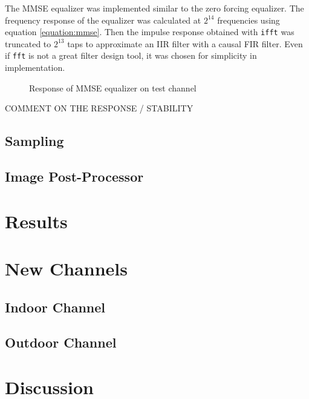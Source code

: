 The MMSE equalizer was implemented similar to the zero forcing equalizer. The frequency response of the equalizer was calculated at $2^{14}$ frequencies using equation \ref{equation:mmse}. Then the impulse response obtained with \texttt{ifft} was truncated to $2^{13}$ taps to approximate an IIR filter with a causal FIR filter. Even if \texttt{fft} is not a great filter design tool, it was chosen for simplicity in implementation.

\begin{figure}
\caption{Response of MMSE equalizer on test channel}
\label{fig:zf_eq}
\end{figure}

{\color{red} COMMENT ON THE RESPONSE / STABILITY}


\subsection{Sampling}


\subsection{Image Post-Processor}

\section{Results}

\section{New Channels}
\subsection{Indoor Channel}
\subsection{Outdoor Channel}

\section{Discussion}

